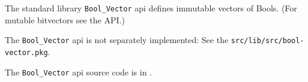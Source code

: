 
The standard library {\tt Bool\_Vector} api defines immutable vectors of Bools. 
(For mutable bitvectors see the  API.)

The {\tt Bool\_Vector} api is not separately implemented:  See the {\tt src/lib/src/bool-vector.pkg}.

The {\tt Bool\_Vector} api source code is in .





